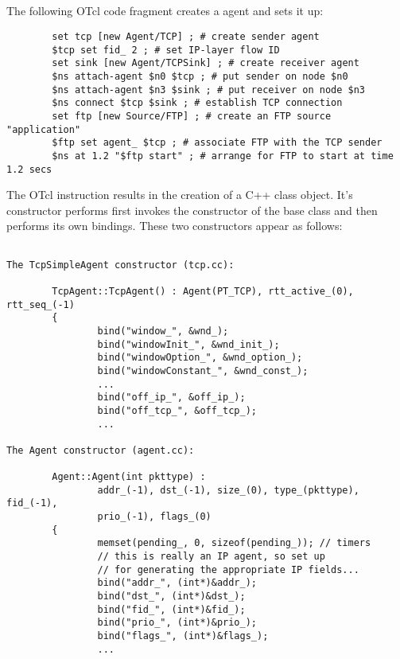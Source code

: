 \subsection{}

The following OTcl code fragment creates a  agent
and sets it up:
\begin{small}
\begin{verbatim}
        set tcp [new Agent/TCP] ; # create sender agent
        $tcp set fid_ 2 ; # set IP-layer flow ID
        set sink [new Agent/TCPSink] ; # create receiver agent
        $ns attach-agent $n0 $tcp ; # put sender on node $n0
        $ns attach-agent $n3 $sink ; # put receiver on node $n3
        $ns connect $tcp $sink ; # establish TCP connection
        set ftp [new Source/FTP] ; # create an FTP source "application"
        $ftp set agent_ $tcp ; # associate FTP with the TCP sender
        $ns at 1.2 "$ftp start" ; # arrange for FTP to start at time 1.2 secs
\end{verbatim}
\end{small}
The OTcl instruction  results in the
creation of a C++  class object.
It's constructor performs first invokes the constructor of the
 base class and then performs its own bindings.
These two constructors appear as follows:
\begin{small}
\begin{verbatim}

The TcpSimpleAgent constructor (tcp.cc):

        TcpAgent::TcpAgent() : Agent(PT_TCP), rtt_active_(0), rtt_seq_(-1)
        {
                bind("window_", &wnd_);
                bind("windowInit_", &wnd_init_);
                bind("windowOption_", &wnd_option_);
                bind("windowConstant_", &wnd_const_);
                ...
                bind("off_ip_", &off_ip_);
                bind("off_tcp_", &off_tcp_);
                ...

The Agent constructor (agent.cc):

        Agent::Agent(int pkttype) : 
                addr_(-1), dst_(-1), size_(0), type_(pkttype), fid_(-1),
                prio_(-1), flags_(0)
        {
                memset(pending_, 0, sizeof(pending_)); // timers
                // this is really an IP agent, so set up
                // for generating the appropriate IP fields...
                bind("addr_", (int*)&addr_);
                bind("dst_", (int*)&dst_);
                bind("fid_", (int*)&fid_);
                bind("prio_", (int*)&prio_);
                bind("flags_", (int*)&flags_);
                ...
\end{verbatim}
\end{small}
